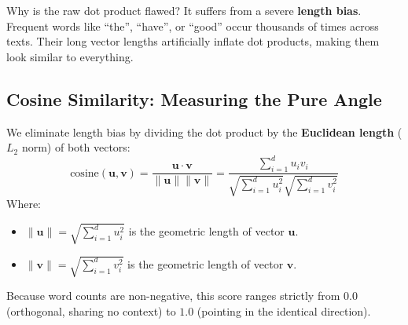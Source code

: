 \documentclass[a4paper,11pt]{article}
\newcommand{\vocab}[1]{\textbf{#1}}
\begin{document}
Why is the raw dot product flawed?
It suffers from a severe \vocab{length bias}.
Frequent words like ``the'', ``have'', or ``good'' occur thousands of times across texts.
Their long vector lengths artificially inflate dot products, making them look similar to everything.

\subsection{Cosine Similarity: Measuring the Pure Angle}
We eliminate length bias by dividing the dot product by the \vocab{Euclidean length} ($L_2$ norm) of both vectors:
\begin{equation}
\text{cosine}(\mathbf{u}, \mathbf{v}) = \frac{\mathbf{u} \cdot \mathbf{v}}{\|\mathbf{u}\| \|\mathbf{v}\|} = \frac{\sum_{i=1}^{d} u_i v_i}{\sqrt{\sum_{i=1}^{d} u_i^2} \sqrt{\sum_{i=1}^{d} v_i^2}}
\end{equation}
Where:
\begin{itemize}
  \item $\|\mathbf{u}\| = \sqrt{\sum_{i=1}^d u_i^2}$ is the geometric length of vector $\mathbf{u}$.
  \item $\|\mathbf{v}\| = \sqrt{\sum_{i=1}^d v_i^2}$ is the geometric length of vector $\mathbf{v}$.
\end{itemize}
Because word counts are non-negative, this score ranges strictly from $0.0$ (orthogonal, sharing no context) to $1.0$ (pointing in the identical direction).
\end{document}
